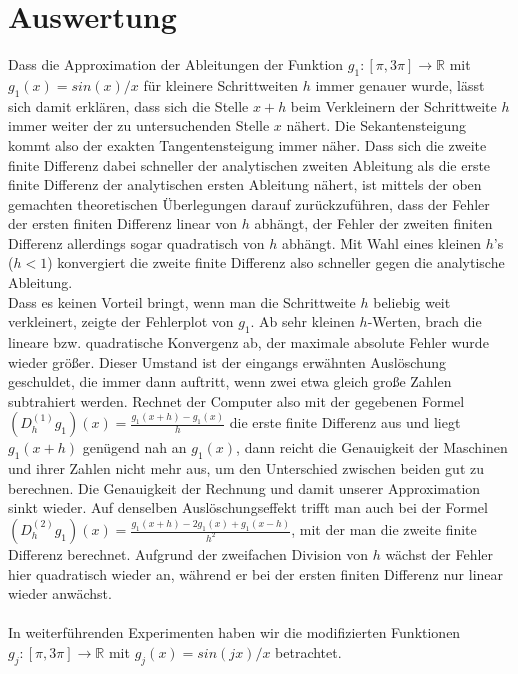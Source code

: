 \documentclass{scrartcl}
\begin{document}
\pagebreak \section{Auswertung}
\label{sec:auswertung}
Dass die Approximation der Ableitungen der Funktion $g_1:[\pi, 3\pi] \rightarrow \mathbb{R}$ mit $g_1(x)=sin(x)/x$ für kleinere Schrittweiten $h$ immer genauer wurde, lässt sich damit erklären, dass sich die Stelle $x+h$ beim Verkleinern der Schrittweite $h$ immer weiter der zu untersuchenden Stelle $x$ nähert.
Die Sekantensteigung kommt also der exakten Tangentensteigung immer näher.
Dass sich die zweite finite Differenz dabei schneller der analytischen zweiten Ableitung als die erste finite Differenz der analytischen ersten Ableitung nähert, ist mittels der oben gemachten theoretischen Überlegungen darauf zurückzuführen, dass der Fehler der ersten finiten Differenz linear von $h$ abhängt, der Fehler der zweiten finiten Differenz allerdings sogar quadratisch von $h$ abhängt.
Mit Wahl eines kleinen $h$'s ($h<1$) konvergiert die zweite finite Differenz also schneller gegen die analytische Ableitung. \\
Dass es keinen Vorteil bringt, wenn man die Schrittweite $h$ beliebig weit verkleinert, zeigte der Fehlerplot von $g_1$. Ab sehr kleinen $h$-Werten, brach die lineare bzw. quadratische Konvergenz ab, der maximale absolute Fehler wurde wieder größer.
Dieser Umstand ist der eingangs erwähnten Auslöschung geschuldet, die immer dann auftritt, wenn zwei etwa gleich große Zahlen subtrahiert werden.
Rechnet der Computer also mit der gegebenen Formel $(D_h^{(1)}g_1)(x) = \frac{g_1(x+h)-g_1(x)}{h}$ die erste finite Differenz aus und liegt $g_1(x+h)$ genügend nah an $g_1(x)$, dann reicht die Genauigkeit der Maschinen und ihrer Zahlen nicht mehr aus, um den Unterschied zwischen beiden gut zu berechnen. Die Genauigkeit der Rechnung und damit unserer Approximation sinkt wieder.
Auf denselben Auslöschungseffekt trifft man auch bei der Formel $(D_h^{(2)}g_1)(x) = \frac{g_1(x+h)-2g_1(x)+g_1(x-h)}{h^2}$, mit der man die zweite finite Differenz berechnet.
Aufgrund der zweifachen Division von $h$ wächst der Fehler hier quadratisch wieder an, während er bei der ersten finiten Differenz nur linear wieder anwächst. \\
 \\
In weiterführenden Experimenten haben wir die modifizierten Funktionen $g_j:[\pi, 3\pi] \rightarrow \mathbb{R}$ mit $g_j(x) = sin(j x)/x$ betrachtet.
\end{document}
